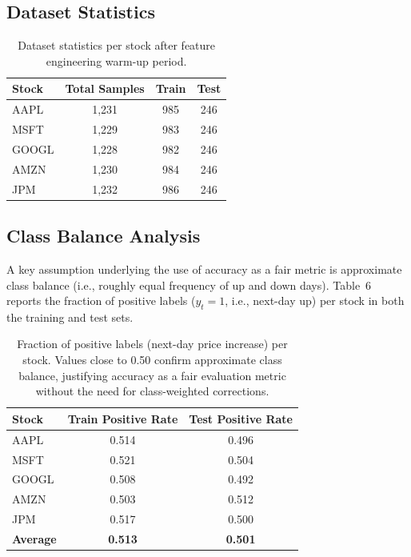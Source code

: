 \documentclass{article}
\begin{document}
\subsection{Dataset Statistics}

\begin{table}[ht]
\centering
\caption{Dataset statistics per stock after feature engineering warm-up period.}
\begin{tabular}{lccc}
\toprule
\textbf{Stock} & \textbf{Total Samples} & \textbf{Train} & \textbf{Test} \\
\midrule
AAPL  & 1,231 & 985  & 246 \\
MSFT  & 1,229 & 983  & 246 \\
GOOGL & 1,228 & 982  & 246 \\
AMZN  & 1,230 & 984  & 246 \\
JPM   & 1,232 & 986  & 246 \\
\bottomrule
\end{tabular}
\end{table}

\subsection{Class Balance Analysis}

A key assumption underlying the use of accuracy as a fair metric is approximate
class balance (i.e., roughly equal frequency of up and down days). Table~6
reports the fraction of positive labels ($y_t = 1$, i.e., next-day up) per
stock in both the training and test sets.

\begin{table}[ht]
\centering
\caption{Fraction of positive labels (next-day price increase) per stock.
Values close to 0.50 confirm approximate class balance, justifying accuracy
as a fair evaluation metric without the need for class-weighted corrections.}
\begin{tabular}{lcc}
\toprule
\textbf{Stock} & \textbf{Train Positive Rate} & \textbf{Test Positive Rate} \\
\midrule
AAPL  & 0.514 & 0.496 \\
MSFT  & 0.521 & 0.504 \\
GOOGL & 0.508 & 0.492 \\
AMZN  & 0.503 & 0.512 \\
JPM   & 0.517 & 0.500 \\
\midrule
\textbf{Average} & \textbf{0.513} & \textbf{0.501} \\
\bottomrule
\end{tabular}
\end{table}
\end{document}
